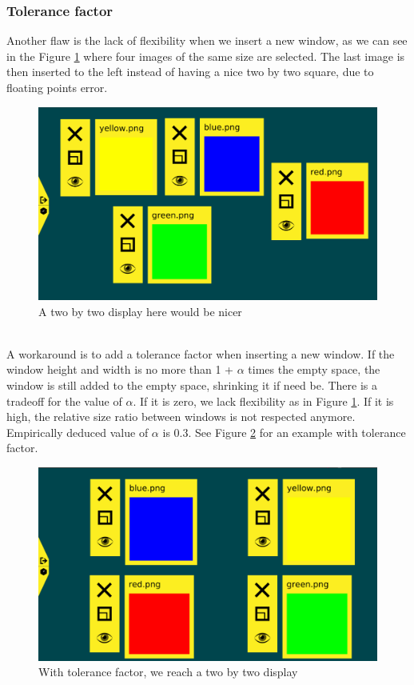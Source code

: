 \documentclass{acmtog}
\begin{document}
\subsubsection{Tolerance factor}
Another flaw is the lack of flexibility when we insert a new window, as we can see in the Figure \ref{fig:Equalbuggy} where four images of the same size are selected. The last image is then inserted to the left instead of having a nice two by two square, due to floating points error. 
\begin{figure}
  \includegraphics[width=\textwidth]{Images/4-equalbuggyCropped.png}
  \caption{A two by two display here would be nicer}
  \label{fig:Equalbuggy}
\end{figure}
\\ 
A workaround is to add a tolerance factor when inserting a new window. If the window height and width is no more than 1 + $\alpha$ times the empty space, the window is still added to the empty space, shrinking it if need be. There is a tradeoff for the value of $\alpha$. If it is zero, we lack flexibility as in Figure \ref{fig:Equalbuggy}.
If it is high, the relative size ratio between windows is not respected anymore. Empirically deduced value of $\alpha$ is 0.3. See Figure \ref{fig:Equalright} for an example with tolerance factor.

\begin{figure}
  \includegraphics[width=\textwidth]{Images/4-equalToleranceCropped.png}
  \caption{With tolerance factor, we reach a two by two display}
  \label{fig:Equalright}
\end{figure}
\end{document}
